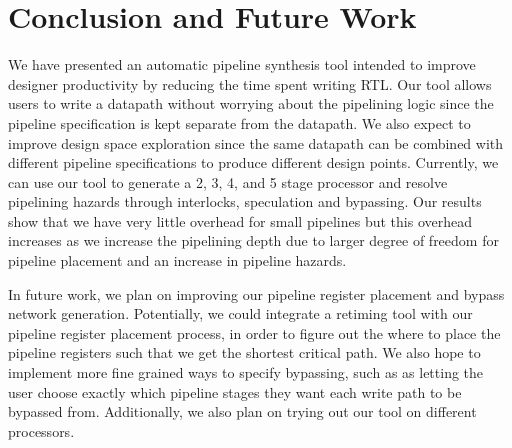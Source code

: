 \section{Conclusion and Future Work}
We have presented an automatic pipeline synthesis tool intended to
improve designer productivity by reducing the time spent writing
RTL. Our tool allows users to write a datapath without worrying about
the pipelining logic since the pipeline specification is kept separate
from the datapath. We also expect to improve design space exploration
since the same datapath can be combined with different pipeline
specifications to produce different design points. Currently, we can
use our tool to generate a 2, 3, 4, and 5 stage processor and resolve
pipelining hazards through interlocks, speculation and bypassing. Our
results show that we have very little overhead for small pipelines but
this overhead increases as we increase the pipelining depth due to
larger degree of freedom for pipeline placement and an increase in
pipeline hazards. 

In future work, we plan on improving our pipeline register placement and bypass network generation. Potentially, we could integrate a retiming tool with our pipeline register placement process, in order to figure out the where to place the pipeline registers such that we get the shortest critical path. We also hope to implement more fine grained ways to specify bypassing, such as as letting the user choose exactly which pipeline stages they want each write path to be bypassed from. Additionally, we also plan on trying out our tool on different processors. 
